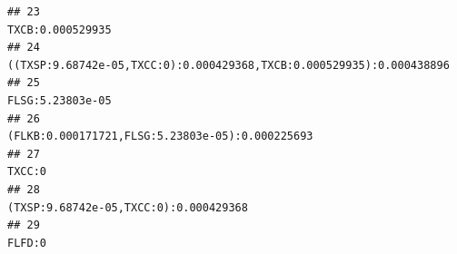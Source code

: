 \documentclass[]{article}
\begin{document}
\begin{verbatim}
## 23                                                                                                                                                                                                                                                                                                                                                                                                  TXCB:0.000529935
## 24                                                                                                                                                                                                                                                                                                                                              ((TXSP:9.68742e-05,TXCC:0):0.000429368,TXCB:0.000529935):0.000438896
## 25                                                                                                                                                                                                                                                                                                                                                                                                  FLSG:5.23803e-05
## 26                                                                                                                                                                                                                                                                                                                                                                   (FLKB:0.000171721,FLSG:5.23803e-05):0.000225693
## 27                                                                                                                                                                                                                                                                                                                                                                                                            TXCC:0
## 28                                                                                                                                                                                                                                                                                                                                                                             (TXSP:9.68742e-05,TXCC:0):0.000429368
## 29                                                                                                                                                                                                                                                                                                                                                                                                            FLFD:0

\end{verbatim}
\end{document}
